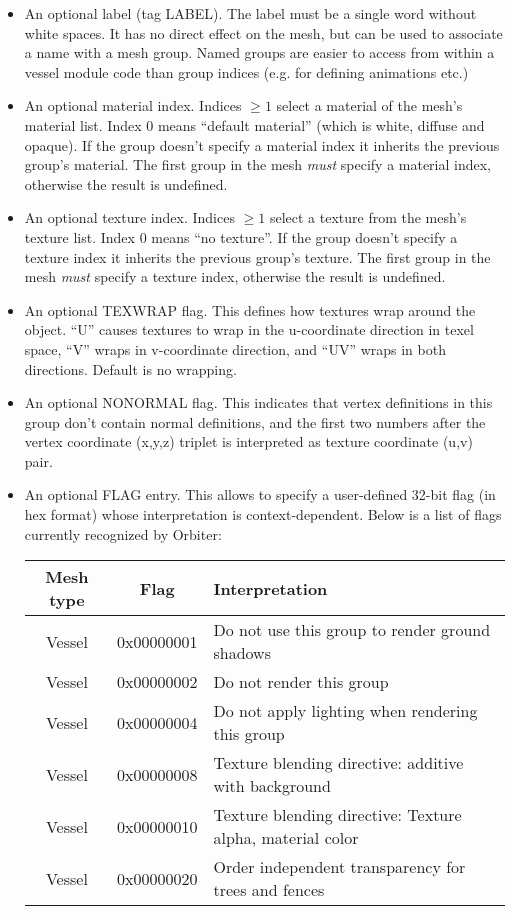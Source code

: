\documentclass[Orbiter Developer Manual.tex]{subfiles}
\begin{document}
\begin{itemize}
\item An optional label (tag LABEL). The label must be a single word without white spaces. It has no direct effect on the mesh, but can be used to associate a name with a mesh group. Named groups are easier to access from within a vessel module code than group indices (e.g. for defining animations etc.)
\item An optional material index. Indices $\geq 1$ select a material of the mesh’s material list. Index 0 means “default material” (which is white, diffuse and opaque). If the group doesn’t specify a material index it inherits the previous group’s material. The first group in the mesh \textit{must} specify a material index, otherwise the result is undefined.
\item An optional texture index. Indices $\geq 1$ select a texture from the mesh’s texture list. Index 0 means “no texture”. If the group doesn’t specify a texture index it inherits the previous group’s texture. The first group in the mesh \textit{must} specify a texture index, otherwise the result is undefined.
\item An optional TEXWRAP flag. This defines how textures wrap around the object. “U” causes textures to wrap in the u-coordinate direction in texel space, “V” wraps in v-coordinate direction, and “UV” wraps in both directions. Default is no wrapping.
\item An optional NONORMAL flag. This indicates that vertex definitions in this group don’t contain normal definitions, and the first two numbers after the vertex coordinate (x,y,z) triplet is interpreted as texture coordinate (u,v) pair.
\item An optional FLAG entry. This allows to specify a user-defined 32-bit flag (in hex format) whose interpretation is context-dependent. Below is a list of flags currently recognized by Orbiter:

\begin{table}[H]
	\centering
	\begin{tabular}{ |c|c|l| }
	\hline\rule{0pt}{2ex}
	\textbf{Mesh type} & \textbf{Flag} & \textbf{Interpretation} \\
	\hline\rule{0pt}{2ex}
	Vessel & 0x00000001 & Do not use this group to render ground shadows\\
	\hline\rule{0pt}{2ex}
	Vessel & 0x00000002 & Do not render this group\\
	\hline\rule{0pt}{2ex}
	Vessel & 0x00000004 & Do not apply lighting when rendering this group\\
	\hline\rule{0pt}{2ex}
	Vessel & 0x00000008 & Texture blending directive: additive with background\\
	\hline\rule{0pt}{2ex}
	Vessel & 0x00000010 & Texture blending directive: Texture alpha, material color\\
	\hline\rule{0pt}{2ex}
	Vessel & 0x00000020 & Order independent transparency for trees and fences\\
	\hline
	\end{tabular}
\end{table}


\end{itemize}
\end{document}

